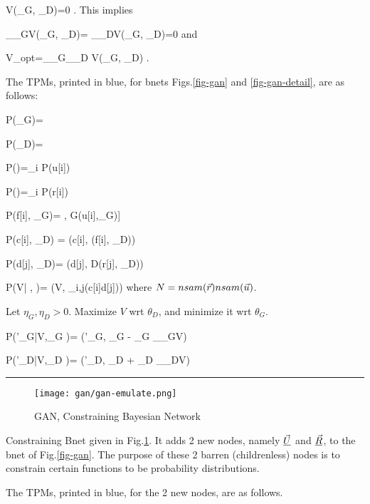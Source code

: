\beq
\delta V(\theta_G, \theta_D)=0
\;.
\eeq
This implies

\beq
 \partial_{\theta_G}V(\theta_G, \theta_D)=
 \partial_{\theta_D}V(\theta_G, \theta_D)=0
\;
\eeq
and

\beq
V_{opt}=\min_{\theta_G}\max_{\theta_D} V(\theta_G, \theta_D)
\;.
\eeq

The TPMs, printed in blue,
for bnets Figs.\ref{fig-gan} and \ref{fig-gan-detail},
are
as follows:

\beq\color{blue}
P(\theta_G)=
\eeq

\beq\color{blue}
P(\theta_D)=
\eeq


\beq\color{blue}
P(\vecu)=\prod_i P(u[i])  \;
\eeq

\beq\color{blue}
P(\vecr)=\prod_i P(r[i])
\eeq


\beq\color{blue}
P(f[i]\cond \vecu, \theta_G)= \delta[f[i], G(u[i],\theta_G)]
\eeq

\beq\color{blue}
P(c[i]\cond \vecf, \theta_D) = \delta(c[i], (f[i], \theta_D))
\eeq

\beq\color{blue}
P(d[j]\cond \vecr, \theta_D)= \delta(d[j], D(r[j], \theta_D))
\eeq




\beq\color{blue}
P(V| \vecd,  \vecc)=
\delta(V, \ln \prod_{i,j}(c[i]d[j]))
\eeq
where $N=nsam({\vec{r}})nsam({\vec{u}})$.


Let $\eta_G, \eta_D> 0$. Maximize $V$ wrt $\theta_D$, and
minimize it wrt $\theta_G$.

\beq\color{blue}
P(\theta'_G|V,\theta_G )=
\delta(\theta'_G, \theta_G - \eta_G
\partial_{\theta_G}V)
\eeq

\beq\color{blue}
P(\theta'_D|V,\theta_D )=
\delta(\theta'_D, \theta_D + \eta_D
\partial_{\theta_D}V)
\eeq

\hrule
\begin{figure}[h!]
\centering
\texttt{[image: gan/gan-emulate.png]}
\caption{GAN, Constraining Bayesian Network}
\label{fig-gan-emulate}
\end{figure}

Constraining Bnet given in Fig.\ref{fig-gan-emulate}. It adds 2 new nodes, namely $\underline{\vec{U}}$ and $\underline{\vec{R}}$, to  the bnet of Fig.\ref{fig-gan}. The purpose of these 2  barren (childrenless) nodes is to constrain certain functions to be probability distributions.

The TPMs,
printed in blue, for the 2 new nodes, are as follows.


